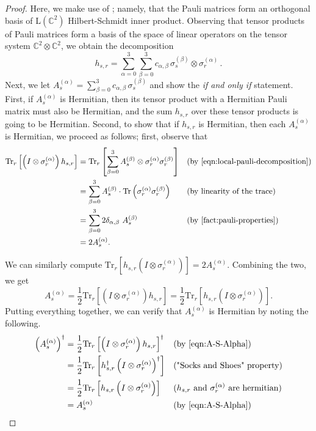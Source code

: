 \documentclass[a4paper,onecolumn,11pt]{quantumarticle}
\theoremstyle{plain}
\begin{document}
\begin{proof}
Here, we make use of ; namely, that the Pauli matrices form an orthogonal basis of $\mathrm{L}(\mathbb{C}^{2})$ Hilbert-Schmidt inner product. Observing that tensor products of Pauli matrices form a basis 
of the space of linear operators on the tensor system $\mathbb{C}^{2} \otimes \mathbb{C}^{2}$, we obtain the decomposition
    \[ h_{s,r} = \sum_{\alpha=0}^{3} \sum_{\beta=0}^{3} c_{\alpha, \beta} \, \sigma_s^{(\beta)} \otimes \sigma_r^{(\alpha)} \, .\]
Next, we let $A^{(\alpha)}_s = \sum_{\beta=0}^{3} c_{\alpha, \beta} \, \sigma_s^{(\beta)}$ and show the \emph{if and only if} statement. First, if $A^{(\alpha)}_s$ is Hermitian, then its tensor product with a Hermitian Pauli matrix must also be Hermitian, and the sum $h_{s,r}$ over these tensor products is going to be Hermitian. Second, to show that if $h_{s,r}$ is Hermitian, then each $A^{(\alpha)}_s$ is Hermitian, we proceed as follows; first, observe that
\begin{align}
\mathrm{Tr}_{r}\left[\left(I \otimes \sigma_r^{(\alpha)} \right) h_{s,r} \right] &= \mathrm{Tr}_{r} \left[\sum\limits_{\beta = 0}^{3} A_s^{(\beta)} \otimes \sigma_r^{(\alpha)} \sigma_r^{(\beta)}\right] && \text{(by \Cref{eqn:local-pauli-decomposition})}\\
    &= \sum\limits_{\beta = 0}^{3} A_s^{(\beta)} \cdot \mathrm{Tr}\left(\sigma_r^{(\alpha)} \sigma_r^{(\beta)}\right) && \text{(by linearity of the trace)}\\
    &= \sum\limits_{\beta = 0}^{3} 2\delta_{\alpha, \beta}\ A_s^{(\beta)}&& (\text{by \Cref{fact:pauli-properties}})\\
    &= 2 A_s^{(\alpha)}.
\end{align}

\noindent We can similarly compute $\mathrm{Tr}_{r}\left[ h_{s,r} \left(I \otimes \sigma_r^{(\alpha)} \right)\right] = 2 A_s^{(\alpha)}$. Combining the two, we get
\begin{equation}\label{eqn:A-S-Alpha}
    A_s^{(\alpha)} = \frac{1}{2} \mathrm{Tr}_{r}\left[\left(I \otimes \sigma_r^{(\alpha)} \right) h_{s,r} \right] = \frac{1}{2} \mathrm{Tr}_{r}\left[ h_{s,r} \left(I \otimes \sigma_r^{(\alpha)} \right)\right].
\end{equation}
Putting everything together, we can verify that $A_s^{(\alpha)}$ is Hermitian by noting the following.
\begin{align}
\left(A_s^{(\alpha)}\right)^\dagger &= \frac{1}{2} \mathrm{Tr}_{r}\left[\left(I \otimes \sigma_r^{(\alpha)} \right) h_{s,r} \right]^\dagger && \text{(by \Cref{eqn:A-S-Alpha})}\\
    &= \frac{1}{2} \mathrm{Tr}_{r}\left[ h_{s,r}^\dagger \left(I \otimes \sigma_r^{(\alpha)} \right)^\dagger \right] && \text{("Socks and Shoes" property)} \\
    &= \frac{1}{2} \mathrm{Tr}_{r}\left[ h_{s,r} \left(I \otimes \sigma_r^{(\alpha)} \right) \right] && \text{($h_{s,r}$ and $\sigma_r^{(\alpha)}$ are hermitian)}\\
    &= A_s^{(\alpha)} && \text{(by \Cref{eqn:A-S-Alpha})}
\end{align}
\end{proof}
\end{document}
